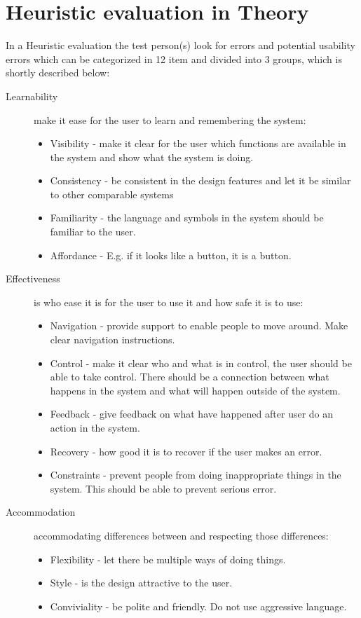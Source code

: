 \section{Heuristic evaluation in Theory}
In a Heuristic evaluation the test person(s) look for errors and potential usability errors which can be categorized in 12 item and divided into 3 groups\citep{DIEB}, which is shortly described below:
\begin{description}
\item[Learnability] make it ease for the user to learn and remembering the system:
\begin{itemize}
	\item Visibility - make it clear for the user which functions are available in the system and show what the system is doing.
	\item Consistency - be consistent in the design features and let it be similar to other comparable systems %
	\item Familiarity - the language and symbols in the system should be familiar to the user.
	\item Affordance -  E.g. if it looks like a button, it is a button. %
\end{itemize}

\item[Effectiveness] is who ease it is for the user to use it and how safe it is to use:
\begin{itemize}
	\item Navigation - provide support to enable people to move around. Make clear navigation instructions.
	\item Control - make it clear who and what is in control, the user should be able to take control. There should be a connection between what happens in the system and what will happen outside of the system. 
	\item Feedback - give feedback on what have happened after user do an action in the system.
	\item Recovery - how good it is to recover if the user makes an error. %
	\item Constraints - prevent people from doing inappropriate things in the system. This should be able to prevent serious error.
\end{itemize}

\item[Accommodation] accommodating differences between and respecting those differences:
\begin{itemize}
	\item Flexibility - let there be multiple ways of doing things.%
	\item Style - is the design attractive to the user. %
	\item Conviviality - be polite and friendly. Do not use aggressive language.
\end{itemize}
\end{description}


